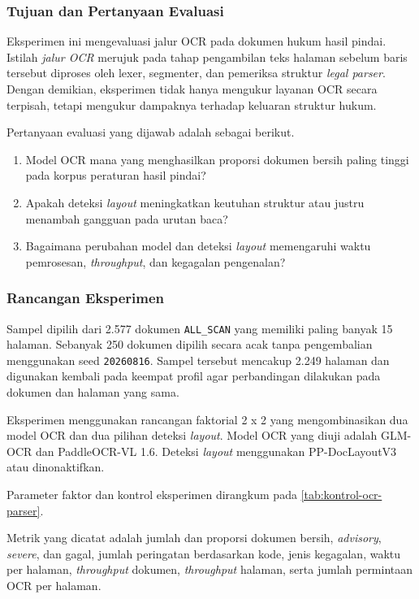 \subsubsection{Tujuan dan Pertanyaan Evaluasi}
\label{sec:tujuan-evaluasi-legal-parser-ocr}

Eksperimen ini mengevaluasi jalur OCR pada dokumen hukum hasil pindai.
Istilah \textit{jalur OCR} merujuk pada tahap pengambilan teks halaman sebelum baris tersebut diproses oleh lexer, segmenter, dan pemeriksa struktur \textit{legal parser}.
Dengan demikian, eksperimen tidak hanya mengukur layanan OCR secara terpisah, tetapi mengukur dampaknya terhadap keluaran struktur hukum.

Pertanyaan evaluasi yang dijawab adalah sebagai berikut.

\begin{enumerate}
  \item Model OCR mana yang menghasilkan proporsi dokumen bersih paling tinggi pada korpus peraturan hasil pindai?
  \item Apakah deteksi \textit{layout} meningkatkan keutuhan struktur atau justru menambah gangguan pada urutan baca?
  \item Bagaimana perubahan model dan deteksi \textit{layout} memengaruhi waktu pemrosesan, \textit{throughput}, dan kegagalan pengenalan?
\end{enumerate}

\subsubsection{Rancangan Eksperimen}
\label{sec:rancangan-legal-parser-ocr}

Sampel dipilih dari 2.577 dokumen \texttt{ALL\_SCAN} yang memiliki paling banyak 15 halaman.
Sebanyak 250 dokumen dipilih secara acak tanpa pengembalian menggunakan seed \texttt{20260816}.
Sampel tersebut mencakup 2.249 halaman dan digunakan kembali pada keempat profil agar perbandingan dilakukan pada dokumen dan halaman yang sama.

Eksperimen menggunakan rancangan faktorial 2 x 2 yang mengombinasikan dua model OCR dan dua pilihan deteksi \textit{layout}.
Model OCR yang diuji adalah GLM-OCR dan PaddleOCR-VL 1.6.
Deteksi \textit{layout} menggunakan PP-DocLayoutV3 atau dinonaktifkan.

Parameter faktor dan kontrol eksperimen dirangkum pada \autoref{tab:kontrol-ocr-parser}.

Metrik yang dicatat adalah jumlah dan proporsi dokumen bersih, \textit{advisory}, \textit{severe}, dan gagal, jumlah peringatan berdasarkan kode, jenis kegagalan, waktu per halaman, \textit{throughput} dokumen, \textit{throughput} halaman, serta jumlah permintaan OCR per halaman.

